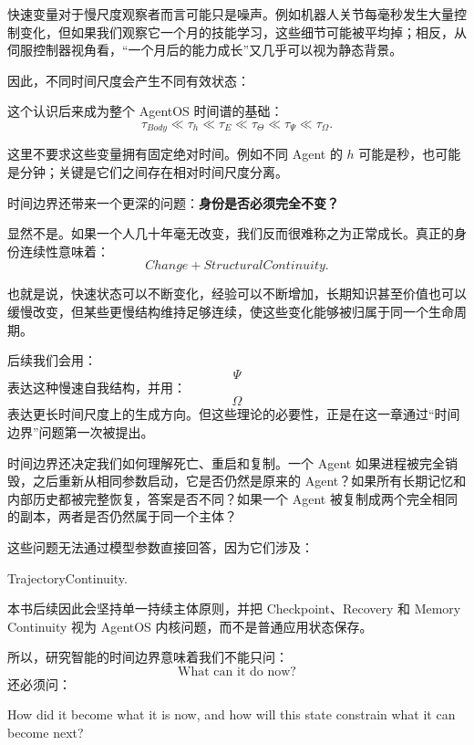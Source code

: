 快速变量对于慢尺度观察者而言可能只是噪声。例如机器人关节每毫秒发生大量控制变化，但如果我们观察它一个月的技能学习，这些细节可能被平均掉；相反，从伺服控制器视角看，“一个月后的能力成长”又几乎可以视为静态背景。

因此，不同时间尺度会产生不同有效状态：
\begin{statementbox}
\centering
{}
\end{statementbox}

这个认识后来成为整个 AgentOS 时间谱的基础：
\[
\tau_{Body}
\ll
\tau_h
\ll
\tau_E
\ll
\tau_\Theta
\ll
\tau_\Psi
\ll
\tau_\Omega.
\]

这里不要求这些变量拥有固定绝对时间。例如不同 Agent 的 \(h\) 可能是秒，也可能是分钟；关键是它们之间存在相对时间尺度分离。

时间边界还带来一个更深的问题：\textbf{身份是否必须完全不变？}

显然不是。如果一个人几十年毫无改变，我们反而很难称之为正常成长。真正的身份连续性意味着：
\[
Change
+
StructuralContinuity.
\]

也就是说，快速状态可以不断变化，经验可以不断增加，长期知识甚至价值也可以缓慢改变，但某些更慢结构维持足够连续，使这些变化能够被归属于同一个生命周期。

后续我们会用：
\[
\Psi
\]
表达这种慢速自我结构，并用：
\[
\Omega
\]
表达更长时间尺度上的生成方向。但这些理论的必要性，正是在这一章通过“时间边界”问题第一次被提出。

时间边界还决定我们如何理解死亡、重启和复制。一个 Agent 如果进程被完全销毁，之后重新从相同参数启动，它是否仍然是原来的 Agent？如果所有长期记忆和内部历史都被完整恢复，答案是否不同？如果一个 Agent 被复制成两个完全相同的副本，两者是否仍然属于同一个主体？

这些问题无法通过模型参数直接回答，因为它们涉及：
\begin{statementbox}
TrajectoryContinuity.
\end{statementbox}

本书后续因此会坚持单一持续主体原则，并把 Checkpoint、Recovery 和 Memory Continuity 视为 AgentOS 内核问题，而不是普通应用状态保存。

所以，研究智能的时间边界意味着我们不能只问：
\[
\text{What can it do now?}
\]
还必须问：
\begin{statementbox}
How did it become what it is now, and how will this state constrain what it can become next?
\end{statementbox}

